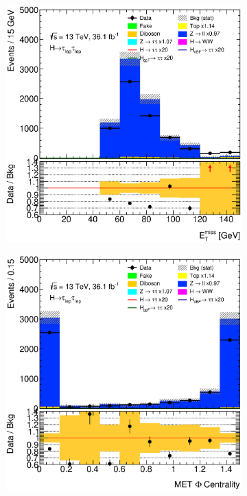\begin{figure}[htb]
\begin{subfigure}[t]{0.3\textwidth}
    \end{subfigure}
    \begin{subfigure}[t]{0.3\textwidth}
        \includegraphics[width=\textwidth]{./plots/mva/modeling/input_vars/VBF_CR/ll-CutMVAVBFCatZllCR-MET-lin.eps}
    \end{subfigure}
    \begin{subfigure}[t]{0.3\textwidth}
        \includegraphics[width=\textwidth]{./plots/mva/modeling/input_vars/VBF_CR/ll-CutMVAVBFCatZllCR-METPhiCentrality2-lin.eps}

\end{subfigure}
\end{figure}
